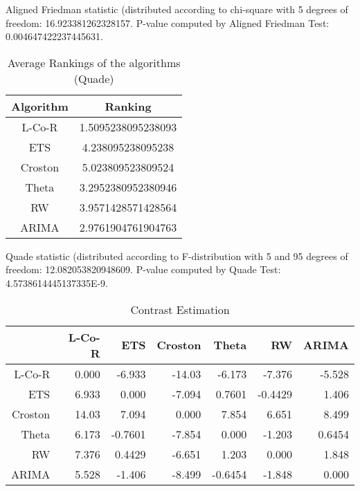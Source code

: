 \documentclass[a4paper,10pt]{article}
\begin{document}
\begin{landscape}
Aligned Friedman statistic (distributed according to chi-square with 5 degrees of freedom: 16.923381262328157. 
P-value computed by Aligned Friedman Test: 0.004647422237445631.\newline


\newpage

\begin{table}[!htp]
\centering
\caption{Average Rankings of the algorithms (Quade)
}\begin{tabular}{c|c}
Algorithm&Ranking\\
\hline
L-Co-R&1.5095238095238093\\
ETS&4.238095238095238\\
Croston&5.023809523809524\\
Theta&3.2952380952380946\\
RW&3.9571428571428564\\
ARIMA&2.9761904761904763\\
\end{tabular}
\end{table}
Quade statistic (distributed according to F-distribution with 5 and 95 degrees of freedom: 12.082053820948609. 
P-value computed by Quade Test: 4.5738614445137335E-9.\newline


\newpage

\begin{table}[!htp]
\centering\tiny
\caption{Contrast Estimation}
\begin{tabular}{
|r|r|r|r|r|r|r|}
\hline
 &L-Co-R&ETS&Croston&Theta&RW&ARIMA\\
\hline
L-Co-R&0.000&-6.933&-14.03&-6.173&-7.376&-5.528\\
\hline
ETS&6.933&0.000&-7.094&0.7601&-0.4429&1.406\\
\hline
Croston&14.03&7.094&0.000&7.854&6.651&8.499\\
\hline
Theta&6.173&-0.7601&-7.854&0.000&-1.203&0.6454\\
\hline
RW&7.376&0.4429&-6.651&1.203&0.000&1.848\\
\hline
ARIMA&5.528&-1.406&-8.499&-0.6454&-1.848&0.000\\
\hline

\end{tabular}
\end{table}

\newpage


\end{landscape}
\end{document}
